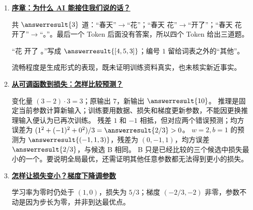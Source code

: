 \begin{enumerate}[leftmargin=5.4em,labelsep=.7em,itemsep=9pt]

\par{}
\item[\textbf{序章}] \label{answer:00-guide}\textbf{\hyperref[check:00-guide]{序章：为什么 AI 能接住我们说的话？}}\par\nobreak
{}共 $\answerresult{3}$ 道：“春天”$\to$“花”；“春天 花”$\to$“开了”；“春天 花 开了”$\to$“。”。最后一个 Token 后面没有答案，所以四个 Token 给出三道题。
\par{}“花 开了 。”写成 $\answerresult{[4,5,3]}$；编号 $1$ 留给词表之外的“其他”。
\par{}流畅程度是生成形式的表现，既未证明训练资料真实，也未核实新近事实。
\par{}
\item[\textbf{第 1 章}] \label{answer:00-functions}\textbf{\hyperref[check:00-functions]{从可调函数到损失：怎样比较预测？}}\par\nobreak
{}\label{answer:16-loss-analytic}
变化量 $(3-2)\cdot3=3$；原输出 $7$，新输出 $\answerresult{10}$。
推理是固定当前参数计算新输入；训练要用数据、损失和梯度更新参数，不能因更换推理输入便认为已再次训练。
残差 $1$ 和 $-1$ 相抵，但对应两个错误预测；均方误差为 $(1^2+(-1)^2+0^2)/3=\answerresult{2/3}>0$。
$w=2,b=1$ 的预测为 $\answerresult{(-1,1,3)}$，残差为 $(0,-1,1)$，均方误差 $\answerresult{2/3}$，与候选 B 相同。
B 只是已经比较的三个候选中损失最小的一个。要说明全局最优，还需证明其他任意参数都无法得到更小的损失。
\par{}
\item[\textbf{第 2 章}] \label{answer:16-loss-gradient}\textbf{\hyperref[check:16-loss-gradient]{怎样让损失变小？梯度下降调参数}}\par\nobreak
 学习率为零时仍处于 $(1,0)$，损失为 $5/3$；梯度 $(-2/3,-2)$ 非零，参数不动是因为步长为零，并非到达最优点。

\end{enumerate}

